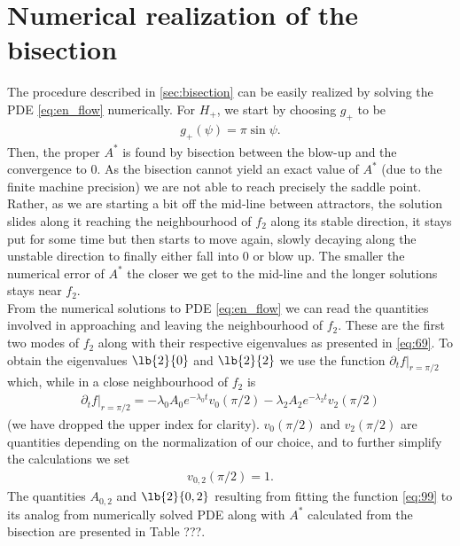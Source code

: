 \section{Numerical realization of the bisection}
\label{sec:numer-real-mount}

The procedure described in \ref{sec:bisection} can be easily realized
by solving the PDE \eqref{eq:en_flow} numerically. For $H_+$, we start
by choosing $g_+$ to be
\begin{align}
  \label{eq:98}
  g_+(\psi)=\pi\sin\psi.
\end{align}
Then, the proper $A^*$ is found by bisection between the blow-up and
the convergence to $0$. As the bisection cannot yield an exact value
of $A^*$ (due to the finite machine precision) we are not able to
reach precisely the saddle point. Rather, as we are starting a bit off
the mid-line between attractors, the solution slides along it reaching
the neighbourhood of $f_2$ along its stable direction, it stays put
for some time but then starts to move again, slowly decaying along the
unstable direction to finally either fall into $0$ or blow up. The
smaller the numerical error of $A^*$ the closer we get to the mid-line
and the longer solutions stays near $f_2$.\\

From the numerical solutions to PDE \eqref{eq:en_flow} we can read the
quantities involved in approaching and leaving the neighbourhood of
$f_2$. These are the first two modes of $f_2$ along with their
respective eigenvalues as presented in \eqref{eq:69}. To obtain the
eigenvalues $\lb{2}{0}$ and $\lb{2}{2}$ we use the function
$\partial_tf\big|_{r=\pi/2}$ which, while in a close neighbourhood of
$f_2$ is
\begin{align}
  \label{eq:99}
  \partial_t
  f\big|_{r=\pi/2}=-\lambda_0A_0e^{-\lambda_0t}v_0(\pi/2)-\lambda_2A_2e^{-\lambda_2t}v_2(\pi/2)
\end{align}
(we have dropped the upper index for clarity). $v_0(\pi/2)$ and
$v_2(\pi/2)$ are quantities depending on the normalization of our
choice, and to further simplify the calculations we set
\begin{align}
  \label{eq:100}
  v_{0,2}(\pi/2)=1.
\end{align}
The quantities $A_{0,2}$ and $\lb{2}{0,2}$ resulting from fitting the
function \eqref{eq:99} to its analog from numerically solved PDE along
with $A^*$ calculated from the bisection are presented in Table ???.\\

